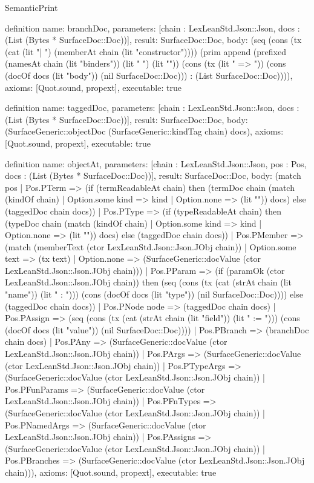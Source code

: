 \begin{lexlean}{SemanticPrint}
\begin{semanticmodule}
definition{
  name: branchDoc,
  parameters: [chain : LexLeanStd.Json::Json, docs : (List (Bytes * SurfaceDoc::Doc))],
  result: SurfaceDoc::Doc,
  body: (seq (cons (tx (cat (lit "| ") (memberAt chain (lit "constructor")))) (prim append (prefixed (namesAt chain (lit "binders")) (lit " ") (lit "")) (cons (tx (lit " => ")) (cons (docOf docs (lit "body")) (nil SurfaceDoc::Doc))) : (List SurfaceDoc::Doc)))),
  axioms: [Quot.sound, propext],
  executable: true
}

definition{
  name: taggedDoc,
  parameters: [chain : LexLeanStd.Json::Json, docs : (List (Bytes * SurfaceDoc::Doc))],
  result: SurfaceDoc::Doc,
  body: (SurfaceGeneric::objectDoc (SurfaceGeneric::kindTag chain) docs),
  axioms: [Quot.sound, propext],
  executable: true
}

definition{
  name: objectAt,
  parameters: [chain : LexLeanStd.Json::Json, pos : Pos, docs : (List (Bytes * SurfaceDoc::Doc))],
  result: SurfaceDoc::Doc,
  body: (match pos
    | Pos.PTerm => (if (termReadableAt chain) then (termDoc chain (match (kindOf chain)
      | Option.some kind => kind
      | Option.none => (lit "")) docs) else (taggedDoc chain docs))
    | Pos.PType => (if (typeReadableAt chain) then (typeDoc chain (match (kindOf chain)
      | Option.some kind => kind
      | Option.none => (lit "")) docs) else (taggedDoc chain docs))
    | Pos.PMember => (match (memberText (ctor LexLeanStd.Json::Json.JObj chain))
      | Option.some text => (tx text)
      | Option.none => (SurfaceGeneric::docValue (ctor LexLeanStd.Json::Json.JObj chain)))
    | Pos.PParam => (if (paramOk (ctor LexLeanStd.Json::Json.JObj chain)) then (seq (cons (tx (cat (strAt chain (lit "name")) (lit " : "))) (cons (docOf docs (lit "type")) (nil SurfaceDoc::Doc)))) else (taggedDoc chain docs))
    | Pos.PNode node => (taggedDoc chain docs)
    | Pos.PAssign => (seq (cons (tx (cat (strAt chain (lit "field")) (lit " := "))) (cons (docOf docs (lit "value")) (nil SurfaceDoc::Doc))))
    | Pos.PBranch => (branchDoc chain docs)
    | Pos.PAny => (SurfaceGeneric::docValue (ctor LexLeanStd.Json::Json.JObj chain))
    | Pos.PArgs => (SurfaceGeneric::docValue (ctor LexLeanStd.Json::Json.JObj chain))
    | Pos.PTypeArgs => (SurfaceGeneric::docValue (ctor LexLeanStd.Json::Json.JObj chain))
    | Pos.PFunParams => (SurfaceGeneric::docValue (ctor LexLeanStd.Json::Json.JObj chain))
    | Pos.PFnTypes => (SurfaceGeneric::docValue (ctor LexLeanStd.Json::Json.JObj chain))
    | Pos.PNamedArgs => (SurfaceGeneric::docValue (ctor LexLeanStd.Json::Json.JObj chain))
    | Pos.PAssigns => (SurfaceGeneric::docValue (ctor LexLeanStd.Json::Json.JObj chain))
    | Pos.PBranches => (SurfaceGeneric::docValue (ctor LexLeanStd.Json::Json.JObj chain))),
  axioms: [Quot.sound, propext],
  executable: true
}


\end{semanticmodule}
\end{lexlean}
